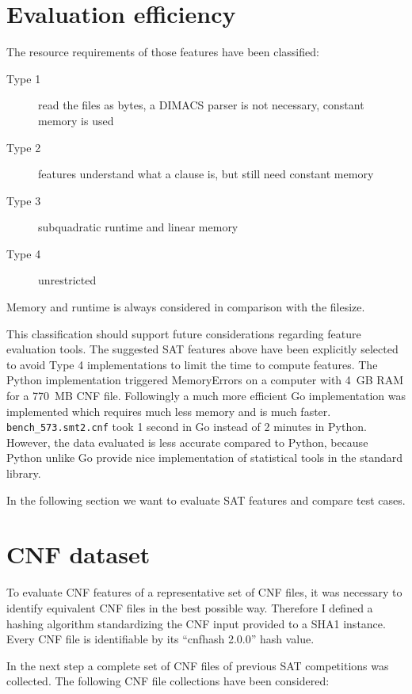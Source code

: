 \section{Evaluation efficiency}
\label{sec:features-efficiency}
%
The resource requirements of those features have been classified:
\begin{description}
  \item[Type 1] read the files as bytes, a DIMACS parser is not necessary, constant memory is used
  \item[Type 2] features understand what a clause is, but still need constant memory
  \item[Type 3] subquadratic runtime and linear memory
  \item[Type 4] unrestricted
\end{description}
%
Memory and runtime is always considered in comparison with the filesize.

This classification should support future considerations regarding feature evaluation tools.
The suggested SAT features above have been explicitly selected to avoid Type 4 implementations to limit the time to compute features.
The Python implementation triggered MemoryErrors on a computer with 4~GB RAM for a 770~MB CNF file.
Followingly a much more efficient Go implementation was implemented which requires much less memory and is much faster.
\texttt{bench\_573.smt2.cnf} took 1 second in Go instead of 2 minutes in Python.
However, the data evaluated is less accurate compared to Python, because Python unlike Go provide nice implementation of statistical tools in the standard library.

In the following section we want to evaluate SAT features and
compare test cases.

\section{CNF dataset}
\label{sec:features-dataset}
%
To evaluate CNF features of a representative set of CNF files, it was necessary to identify equivalent CNF files in the best possible way.
Therefore I defined a hashing algorithm standardizing the CNF input provided to a SHA1 instance. Every CNF file is identifiable by its
\enquote{cnfhash 2.0.0} hash value.

In the next step a complete set of CNF files of previous SAT competitions was collected.
The following CNF file collections have been considered:

